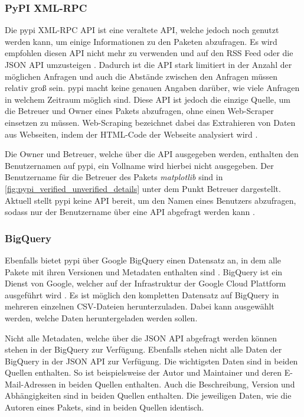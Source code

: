 \subsubsection*{PyPI XML-RPC}
\label{subsubsec:pypi_xml_rpc}
Die \gls{pypi} XML-RPC API ist eine veraltete API, welche jedoch noch genutzt werden kann, um einige Informationen zu den Paketen abzufragen.
Es wird empfohlen diesen API nicht mehr zu verwenden und auf den RSS Feed oder die JSON API umzusteigen \autocite{python_software_foundation_warehouse_2024}.
Dadurch ist die API stark limitiert in der Anzahl der möglichen Anfragen und auch die Abstände zwischen den Anfragen müssen relativ groß sein.
\gls{pypi} macht keine genauen Angaben darüber, wie viele Anfragen in welchem Zeitraum möglich sind.
Diese API ist jedoch die einzige Quelle, um die Betreuer und Owner eines Pakets abzufragen, ohne einen Web-Scraper einsetzen zu müssen.
Web-Scraping bezeichnet dabei das Extrahieren von Daten aus Webseiten, indem der HTML-Code der Webseite analysiert wird \autocite{richardson_beautifulsoup4_2024}.

Die Owner und Betreuer, welche über die API ausgegeben werden, enthalten den Benutzernamen auf \gls{pypi}, ein Vollname wird hierbei nicht ausgegeben.
Der Benutzername für die Betreuer des Pakets \emph{matplotlib} sind in \autoref{fig:pypi_verified_unverified_details} unter dem Punkt \glqq Betreuer\grqq{} dargestellt.
Aktuell stellt \gls{pypi} keine API bereit, um den Namen eines Benutzers abzufragen, sodass nur der Benutzername über eine API abgefragt werden kann \autocite{python_software_foundation_add_2024}.

\subsubsection*{BigQuery}
\label{subsubsec:pypi_bigquery}
Ebenfalls bietet \gls{pypi} über Google BigQuery einen Datensatz an, in dem alle Pakete mit ihren Versionen und Metadaten enthalten sind \autocite{python_software_foundation_warehouse_2024}.
BigQuery ist ein Dienst von Google, welcher auf der Infrastruktur der Google Cloud Plattform ausgeführt wird \autocite{google_bigquery_2024}.
Es ist möglich den kompletten Datensatz auf BigQuery in mehreren einzelnen CSV-Dateien herunterzuladen.
Dabei kann ausgewählt werden, welche Daten heruntergeladen werden sollen.

Nicht alle Metadaten, welche über die JSON API abgefragt werden können stehen in der BigQuery zur Verfügung.
Ebenfalls stehen nicht alle Daten der BigQuery in der JSON API zur Verfügung.
Die wichtigsten Daten sind in beiden Quellen enthalten.
So ist beispielsweise der Autor und Maintainer und deren E-Mail-Adressen in beiden Quellen enthalten.
Auch die Beschreibung, Version und Abhängigkeiten sind in beiden Quellen enthalten.
Die jeweiligen Daten, wie die Autoren eines Pakets, sind in beiden Quellen identisch.

